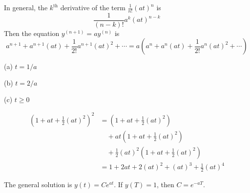 \documentclass[a4paper]{article}
\begin{document}
In general, the \(k^{\text{th}}\) derivative of the term \(\frac{1}{n!} \!\left( at \right)^{n}\) is
\[
	\frac{1}{\!\left( n-k \right)!} a^{k} \!\left( at \right)^{n-k}
\]
Then the equation \(y^{\!\left( n + 1 \right)} = ay^{\!\left( n \right) }\) is
\[
	a^{n + 1} + a^{n + 1} \!\left( at \right) + \frac{1}{2!} a^{n + 1} \!\left( at \right)^{2} + \cdots = a \!\left( a^{n} + a^{n} \!\left( at \right) + \frac{1}{2!} a^{n} \!\left( at \right)^{2} + \cdots \right) 
\]


\par (a) \(t = 1/a\)
\vspace{12pt}
\par (b) \(t = 2/a\)
\vspace{12pt}
\par (c) \(t \ge 0\)

\begin{align*}
	\!\left( 1 + at + \frac{1}{2} \!\left( at \right)^{2} \right)^{2} &= \!\left( 1 + at + \frac{1}{2} \!\left( at \right)^{2} \right)  \\
	 & \quad + at \!\left( 1 + at + \frac{1}{2} \!\left( at \right)^{2} \right)  \\ 
	 & \quad + \frac{1}{2} \!\left( at \right)^{2} \!\left( 1 + at + \frac{1}{2} \!\left( at \right)^{2} \right) \\
	 & = 1 + 2at + 2 \!\left( at \right)^{2} + \!\left( at \right)^{3} + \frac{1}{2} \!\left( at \right)^{4}
\end{align*}


The general solution is \(y \!\left( t \right) = Ce^{at}\). If \(y \!\left( T \right) = 1\), then \(C = e^{-aT}\).
\end{document}
